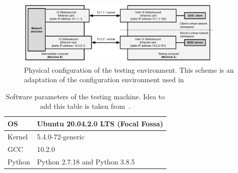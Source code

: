\documentclass[12pt,a4paper,twoside,openright]{report}
\begin{document}
    \begin{figure}[ht]
    \centering
    \includegraphics[width=0.9\textwidth]{figs/Physical_testing_environment.png}
    \caption[Physical configuration of the testing environment]{Physical configuration of the testing environment. This scheme is an adaptation of the configuration environment used in ~\cite{Making_QUIC_Quicker}}
    \label{fig:Physical_testing_environment}
    \end{figure}
    
    \begin{table}[ht]
        \centering
        \begin{tabular}{|l|l|}
        \hline
        OS     & Ubuntu 20.04.2.0 LTS (Focal Fossa) \\ \hline
        Kernel & 5.4.0-72-generic                   \\ \hline
        GCC    & 10.2.0                             \\ \hline
        Python & Python 2.7.18 and Python 3.8.5     \\ \hline
        \end{tabular}
        
        \caption[Software parameters of the testing machine]{Software parameters of the testing machine. Idea to add this table is taken from~\cite{quic_vs_tcp}.}
        \label{software_parameters_of_testing_machine}
    \end{table}
    
\end{document}
